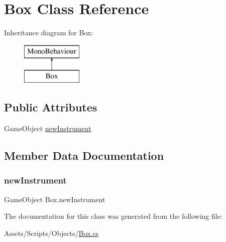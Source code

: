 \hypertarget{class_box}{}\section{Box Class Reference}
\label{class_box}
Inheritance diagram for Box\+:\begin{figure}[H]
\begin{center}
\leavevmode
\includegraphics[height=2.000000cm]{class_box}
\end{center}
\end{figure}
\subsection*{Public Attributes}
\begin{DoxyCompactItemize}
\item 
Game\+Object \mbox{\hyperlink{class_box_ab1079b5543c8e8961ceb43899a5f850d}{new\+Instrument}}
\end{DoxyCompactItemize}


\subsection{Member Data Documentation}
\mbox{\label{class_box_ab1079b5543c8e8961ceb43899a5f850d}} 
\subsubsection{\texorpdfstring{new\+Instrument}{newInstrument}}
{\footnotesize\ttfamily Game\+Object Box.\+new\+Instrument}



The documentation for this class was generated from the following file\+:\begin{DoxyCompactItemize}
\item 
Assets/\+Scripts/\+Objects/\mbox{\hyperlink{_box_8cs}{Box.\+cs}}\end{DoxyCompactItemize}
